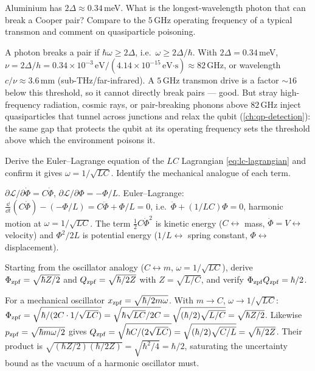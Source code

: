 \begin{exercise}
Aluminium has $2\Delta\approx0.34\,$meV. What is the longest-wavelength
photon that can break a Cooper pair? Compare to the $5\,$GHz operating
frequency of a typical transmon and comment on quasiparticle
poisoning.
\begin{solution}
A photon breaks a pair if $\hbar\omega\geq2\Delta$, i.e.\
$\omega\geq2\Delta/\hbar$. With $2\Delta=0.34\,$meV,
$\nu=2\Delta/h=0.34\times10^{-3}\,\text{eV}/(4.14\times10^{-15}\,\text{eV·s})
\approx82\,$GHz, or wavelength $c/\nu\approx3.6\,$mm
(sub-THz/far-infrared). A $5\,$GHz transmon drive is a factor
$\sim16$ below this threshold, so it cannot directly break pairs ---
good. But stray high-frequency radiation, cosmic rays, or
pair-breaking phonons above $82\,$GHz inject quasiparticles that
tunnel across junctions and relax the qubit (\cref{ch:qp-detection}):
the same gap that protects the qubit at its operating frequency sets
the threshold above which the environment poisons it.
\end{solution}
\end{exercise}

\begin{exercise}
Derive the Euler--Lagrange equation of the $LC$ Lagrangian
\cref{eq:lc-lagrangian} and confirm it gives $\omega=1/\sqrt{LC}$.
Identify the mechanical analogue of each term.
\begin{solution}
$\partial\mathcal L/\partial\dot\Phi=C\dot\Phi$,
$\partial\mathcal L/\partial\Phi=-\Phi/L$. Euler--Lagrange:
$\frac{\dd}{\dd t}(C\dot\Phi)-(-\Phi/L)=C\ddot\Phi+\Phi/L=0$, i.e.\
$\ddot\Phi+(1/LC)\Phi=0$, harmonic motion at
$\omega=1/\sqrt{LC}$. The term $\tfrac12 C\dot\Phi^2$ is kinetic
energy ($C\leftrightarrow$ mass, $\dot\Phi=V\leftrightarrow$ velocity)
and $\Phi^2/2L$ is potential energy
($1/L\leftrightarrow$ spring constant, $\Phi\leftrightarrow$
displacement).
\end{solution}
\end{exercise}

\begin{exercise}
Starting from the oscillator analogy ($C\leftrightarrow m$,
$\omega=1/\sqrt{LC}$), derive $\Phi_{\rm zpf}=\sqrt{\hbar Z/2}$ and
$Q_{\rm zpf}=\sqrt{\hbar/2Z}$ with $Z=\sqrt{L/C}$, and verify
$\Phi_{\rm zpf}Q_{\rm zpf}=\hbar/2$.
\begin{solution}
For a mechanical oscillator $x_{\rm zpf}=\sqrt{\hbar/2m\omega}$. With
$m\to C$, $\omega\to1/\sqrt{LC}$:
$\Phi_{\rm zpf}=\sqrt{\hbar/(2C\cdot1/\sqrt{LC})}
=\sqrt{\hbar\sqrt{LC}/2C}=\sqrt{(\hbar/2)\sqrt{L/C}}=\sqrt{\hbar Z/2}$.
Likewise $p_{\rm zpf}=\sqrt{\hbar m\omega/2}$ gives
$Q_{\rm zpf}=\sqrt{\hbar C/(2\sqrt{LC})}=\sqrt{(\hbar/2)\sqrt{C/L}}
=\sqrt{\hbar/2Z}$. Their product is
$\sqrt{(\hbar Z/2)(\hbar/2Z)}=\sqrt{\hbar^2/4}=\hbar/2$, saturating the
uncertainty bound as the vacuum of a harmonic oscillator must.
\end{solution}
\end{exercise}

